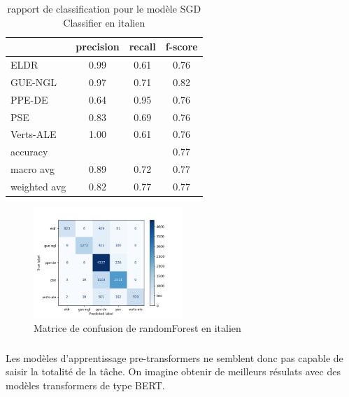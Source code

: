 \documentclass[11pt]{article}
\begin{document}
\begin{table}[h]
\centering
\begin{tabular}{lccc}
\hline
 & precision & recall & f-score\\
\hline
ELDR & 0.99 & 0.61 &  0.76\\
GUE-NGL&0.97  &0.71 & 0.82\\
PPE-DE & 0.64  &0.95  &0.76 \\ 
PSE &  0.83  &  0.69   &0.76 \\ 
Verts-ALE &  1.00   & 0.61 &  0.76\\
\hline
accuracy& & &    0.77 \\
macro avg &  0.89 & 0.72 &  0.77 \\
weighted avg &  0.82 &0.77 &0.77 \\
\hline
\end{tabular}
\caption{rapport de classification pour le modèle SGD Classifier en italien}
\label{tab:randomForestit}
\end{table}

\begin{figure}[h]
\includegraphics[width=0.5\textwidth]{matriceConfusionrandomForestit}
\caption{Matrice de confusion de randomForest en italien}
\centering
\end{figure}

\subparagraph{}
Les modèles d'apprentissage pre-transformers ne semblent donc pas capable de saisir la totalité de la tâche. On imagine obtenir de meilleurs résulats avec des modèles transformers de type BERT.
\end{document}
